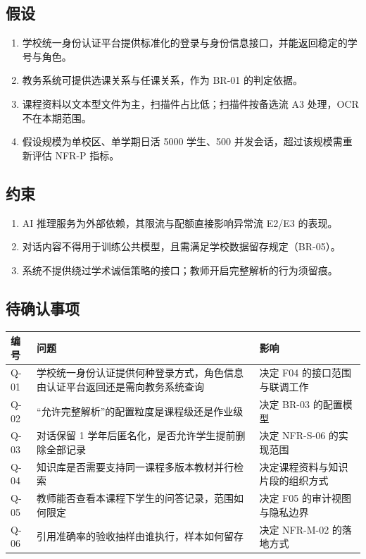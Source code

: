 \documentclass[12pt,a4paper]{ctexart}
\begin{document}
\subsection{假设}

\begin{enumerate}
  \item 学校统一身份认证平台提供标准化的登录与身份信息接口，并能返回稳定的学号与角色。
  \item 教务系统可提供选课关系与任课关系，作为 BR-01 的判定依据。
  \item 课程资料以文本型文件为主，扫描件占比低；扫描件按备选流 A3 处理，OCR 不在本期范围。
  \item 假设规模为单校区、单学期日活 5000 学生、500 并发会话，超过该规模需重新评估 NFR-P 指标。
\end{enumerate}

\subsection{约束}

\begin{enumerate}
  \item AI 推理服务为外部依赖，其限流与配额直接影响异常流 E2/E3 的表现。
  \item 对话内容不得用于训练公共模型，且需满足学校数据留存规定（BR-05）。
  \item 系统不提供绕过学术诚信策略的接口；教师开启完整解析的行为须留痕。
\end{enumerate}

\subsection{待确认事项}

\begin{longtable}{@{}C{1.2cm}L{9.0cm}L{4.6cm}@{}}
  \toprule
  \textbf{编号} & \textbf{问题} & \textbf{影响} \\
  \midrule
  \endhead
  Q-01 & 学校统一身份认证提供何种登录方式，角色信息由认证平台返回还是需向教务系统查询 & 决定 F04 的接口范围与联调工作 \\
  Q-02 & “允许完整解析”的配置粒度是课程级还是作业级 & 决定 BR-03 的配置模型 \\
  Q-03 & 对话保留 1 学年后匿名化，是否允许学生提前删除全部记录 & 决定 NFR-S-06 的实现范围 \\
  Q-04 & 知识库是否需要支持同一课程多版本教材并行检索 & 决定课程资料与知识片段的组织方式 \\
  Q-05 & 教师能否查看本课程下学生的问答记录，范围如何限定 & 决定 F05 的审计视图与隐私边界 \\
  Q-06 & 引用准确率的验收抽样由谁执行，样本如何留存 & 决定 NFR-M-02 的落地方式 \\
  \bottomrule
\end{longtable}
\end{document}
